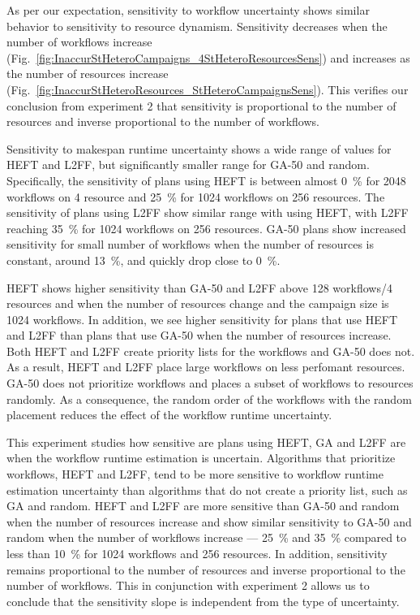 As per our expectation, sensitivity to workflow uncertainty shows similar behavior to sensitivity to resource dynamism.
Sensitivity decreases when the number of workflows increase (Fig.~\ref{fig:InaccurStHeteroCampaigns_4StHeteroResourcesSens}) and increases as the number of resources increase (Fig.~\ref{fig:InaccurStHeteroResources_StHeteroCampaignsSens}).
This verifies our conclusion from experiment 2 that sensitivity is proportional to the number of resources and inverse proportional to the number of workflows.

Sensitivity to makespan runtime uncertainty shows a wide range of values for HEFT and L2FF, but significantly smaller range for GA-50 and random.
Specifically, the sensitivity of plans using HEFT is between almost 0~\% for 2048 workflows on 4 resource and 25~\% for 1024 workflows on 256 resources.
The sensitivity of plans using L2FF show similar range with using HEFT, with L2FF reaching 35~\% for 1024 workflows on 256 resources.
GA-50 plans show increased sensitivity for small number of workflows when the number of resources is constant, around 13~\%, and quickly drop close to 0~\%.

HEFT shows higher sensitivity than GA-50 and L2FF above 128 workflows/4 resources and when the number of resources change and the campaign size is 1024 workflows.
In addition, we see higher sensitivity for plans that use HEFT and L2FF than plans that use GA-50 when the number of resources increase.
Both HEFT and L2FF create priority lists for the workflows and GA-50 does not.
As a result, HEFT and L2FF place large workflows on less perfomant resources.
GA-50 does not prioritize workflows and places a subset of workflows to resources randomly.
As a consequence, the random order of the workflows with the random placement reduces the effect of the workflow runtime uncertainty.

This experiment studies how sensitive are plans using HEFT, GA and L2FF are when the workflow runtime estimation is uncertain.
Algorithms that prioritize workflows, HEFT and L2FF, tend to be more sensitive to workflow runtime estimation uncertainty than algorithms that do not create a priority list, such as GA and random.
HEFT and L2FF are more sensitive than GA-50 and random when the number of resources increase and show similar sensitivity to GA-50 and random when the number of workflows increase --- 25~\% and 35~\% compared to less than 10~\% for 1024 workflows and 256 resources.
In addition, sensitivity remains proportional to the number of resources and inverse proportional to the number of workflows.
This in conjunction with experiment 2 allows us to conclude that the sensitivity slope is independent from the type of uncertainty.

